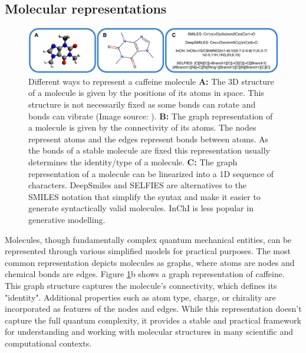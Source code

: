 \subsection{Molecular representations}
\begin{figure}
      \centering
      \includegraphics[width=\textwidth]{figures/representations/representations.pdf}
      \caption{Different ways to represent a caffeine molecule \textbf{A:}  The 3D structure of a molecule is given by the positions of its atoms in
            space. This structure is not necessarily fixed as some bonds can rotate and bonds can
            vibrate (Image source: \citep{EnglishCaffeine3D2010}). \textbf{B:} The graph
            representation of a molecule is given by the connectivity of its atoms. The nodes
            represent atoms and the edges represent bonds between atoms. As the bonds of a stable
            molecule are fixed this representation usually determines the identity/type of a
            molecule. \textbf{C:} The graph representation of a molecule can be linearized into a 1D
            sequence of characters. DeepSmiles and SELFIES are alternatives to the SMILES notation that
            simplify the syntax and make it easier to generate syntactically valid molecules. InChI is
            less popular in generative modelling.
            \label{fig:molecular-graph}}
\end{figure}
Molecules, though fundamentally complex quantum mechanical entities, can be represented through
various simplified models for practical purposes. The most common representation depicts molecules
as graphs, where atoms are nodes and chemical bonds are edges. Figure \ref{fig:molecular-graph}b
shows a graph representation of caffeine. This graph structure captures the molecule's connectivity,
which defines its "identity". Additional properties such as atom type, charge, or chirality are
incorporated as features of the nodes and edges. While this representation doesn't capture the full
quantum complexity, it provides a stable and practical framework for understanding and working with
molecular structures in many scientific and computational contexts.

